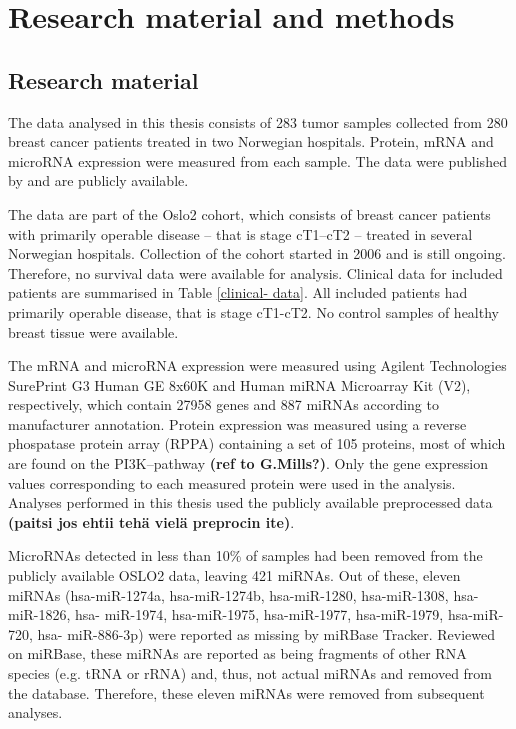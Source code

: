 


\section{Research material and methods}\label{material-and-methods}

\subsection{Research material}

The data analysed in this thesis consists of 283 tumor samples collected from
280 breast cancer patients treated in two Norwegian hospitals. Protein, mRNA
and microRNA expression were measured from each sample. The data were
published by \citet{Aure2015} and are publicly available.

The data are part of the Oslo2 cohort, which consists of breast cancer
patients with primarily operable disease -- that is stage cT1--cT2 -- treated
in several Norwegian hospitals. Collection of the cohort started in 2006 and
is still ongoing. Therefore, no survival data were available for analysis.
Clinical data for included patients are summarised in Table \ref{clinical-
data}. All included patients had primarily operable disease, that is stage
cT1-cT2. No control samples of healthy breast tissue were available.



The mRNA and microRNA expression were measured using Agilent Technologies
SurePrint G3 Human GE 8x60K and Human miRNA Microarray Kit (V2), respectively,
which contain 27958 genes and 887 miRNAs according to manufacturer annotation.
Protein expression was measured using a reverse phospatase protein array
(RPPA) containing a set of 105 proteins, most of which are found on the
PI3K--pathway \textbf{(ref to G.Mills?)}. Only the gene expression values
corresponding to each measured protein were used in the analysis. Analyses
performed in this thesis used the publicly available preprocessed data
\textbf{(paitsi jos ehtii tehä vielä preprocin ite)}.

MicroRNAs detected in less than 10\% of samples had been removed from the
publicly available OSLO2 data, leaving 421 miRNAs. Out of these, eleven miRNAs
(hsa-miR-1274a, hsa-miR-1274b, hsa-miR-1280, hsa-miR-1308, hsa- miR-1826, hsa-
miR-1974, hsa-miR-1975, hsa-miR-1977, hsa-miR-1979, hsa-miR-720, hsa-
miR-886-3p) were reported as missing by miRBase Tracker. Reviewed on miRBase,
these miRNAs are reported as being fragments of other RNA species (e.g. tRNA
or rRNA) and, thus, not actual miRNAs and removed from the database.
Therefore, these eleven miRNAs were removed from subsequent analyses.




